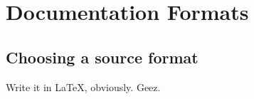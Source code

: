 \chapter{Documentation Formats}

\section{Choosing a source format}

Write it in LaTeX, obviously. Geez.
